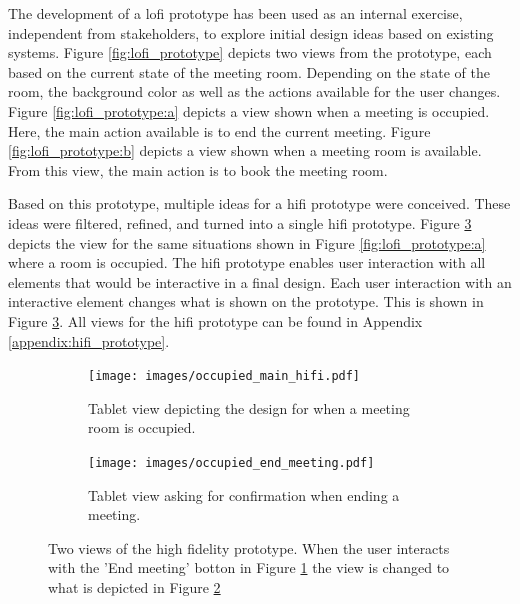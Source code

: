 The development of a lofi prototype has been used as an internal exercise, independent from stakeholders, to explore initial design ideas based on existing systems.
Figure \ref{fig:lofi_prototype} depicts two views from the prototype, each based on the current state of the meeting room.
Depending on the state of the room, the background color as well as the actions available for the user changes.
Figure \ref{fig:lofi_prototype:a} depicts a view shown when a meeting is occupied.
Here, the main action available is to end the current meeting.
Figure \ref{fig:lofi_prototype:b} depicts a view shown when a meeting room is available.
From this view, the main action is to book the meeting room.

Based on this prototype, multiple ideas for a hifi prototype were conceived.
These ideas were filtered, refined, and turned into a single hifi prototype.
Figure \ref{fig:hifi_prototype_interaction} depicts the view for the same situations shown in Figure \ref{fig:lofi_prototype:a} where a room is occupied.
The hifi prototype enables user interaction with all elements that would be interactive in a final design.
Each user interaction with an interactive element changes what is shown on the prototype. 
This is shown in Figure \ref{fig:hifi_prototype_interaction}. 
All views for the hifi prototype can be found in Appendix \ref{appendix:hifi_prototype}.

\begin{figure}
    \centering
    \begin{subfigure}[b]{0.49\textwidth}
        \centering
        \texttt{[image: images/occupied\_main\_hifi.pdf]}
        \caption{Tablet view depicting the design for when a meeting room is occupied.}
        \label{fig:hifi_prototype:a}
    \end{subfigure}
    \begin{subfigure}[b]{0.49\textwidth}
        \centering
        \texttt{[image: images/occupied\_end\_meeting.pdf]}
        \caption{Tablet view asking for confirmation when ending a meeting.}
        \label{fig:hifi_prototype:b}
    \end{subfigure}
    \caption{Two views of the high fidelity prototype. When the user interacts with the 'End meeting' botton in Figure \ref{fig:hifi_prototype:a} the view is changed to what is depicted in Figure \ref{fig:hifi_prototype:b}}
    \label{fig:hifi_prototype_interaction}
\end{figure}
